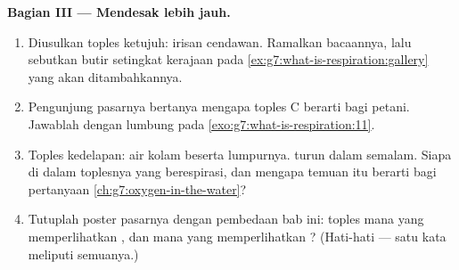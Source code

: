 \begin{problem}
\medskip\noindent\textbf{Bagian III --- Mendesak lebih jauh.}
\begin{enumerate}[resume]
  \item Diusulkan toples ketujuh: irisan cendawan. Ramalkan bacaannya,
        lalu sebutkan butir setingkat kerajaan pada
        \cref{ex:g7:what-is-respiration:gallery} yang akan
        ditambahkannya.
  \item Pengunjung pasarnya bertanya mengapa toples C berarti bagi
        petani. Jawablah dengan lumbung pada
        \cref{exo:g7:what-is-respiration:11}.
  \item Toples kedelapan: air kolam beserta lumpurnya.  turun
        dalam semalam. Siapa di dalam toplesnya yang berespirasi, dan
        mengapa temuan itu berarti bagi pertanyaan
        \cref{ch:g7:oxygen-in-the-water}?
  \item Tutuplah poster pasarnya dengan pembedaan bab ini: toples mana
        yang memperlihatkan \emph{}, dan mana yang
        memperlihatkan \emph{}? (Hati-hati --- satu kata
        meliputi semuanya.)
\end{enumerate}
\end{problem}
